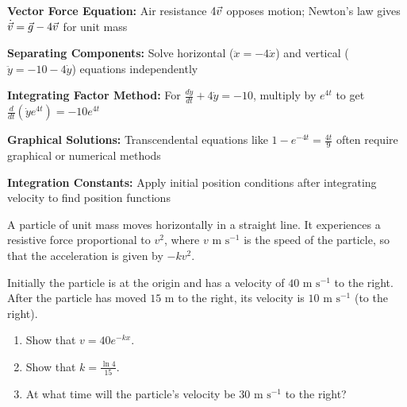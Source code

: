 \begin{takeaways}
\item \textbf{Vector Force Equation:} Air resistance $4\vec{v}$ opposes motion; Newton's law gives $\dot{\vec{v}} = \vec{g} - 4\vec{v}$ for unit mass
\item \textbf{Separating Components:} Solve horizontal ($\ddot{x} = -4\dot{x}$) and vertical ($\ddot{y} = -10 - 4\dot{y}$) equations independently
\item \textbf{Integrating Factor Method:} For $\frac{d\dot{y}}{dt} + 4\dot{y} = -10$, multiply by $e^{4t}$ to get $\frac{d}{dt}(\dot{y}e^{4t}) = -10e^{4t}$
\item \textbf{Graphical Solutions:} Transcendental equations like $1-e^{-4t} = \frac{4t}{9}$ often require graphical or numerical methods
\item \textbf{Integration Constants:} Apply initial position conditions after integrating velocity to find position functions
\end{takeaways}

\newpage

\begin{problem}
A particle of unit mass moves horizontally in a straight line. It experiences a resistive force proportional to $v^2$, where $v \text{ m s}^{-1}$ is the speed of the particle, so that the acceleration is given by $-kv^2$.

Initially the particle is at the origin and has a velocity of $40 \text{ m s}^{-1}$ to the right. After the particle has moved $15 \text{ m}$ to the right, its velocity is $10 \text{ m s}^{-1}$ (to the right).

\begin{enumerate}[label=(\roman*)]
    \item Show that $v = 40e^{-kx}$.
    \item Show that $k = \frac{\ln 4}{15}$.
    \item At what time will the particle's velocity be $30 \text{ m s}^{-1}$ to the right?
\end{enumerate}
\end{problem}

